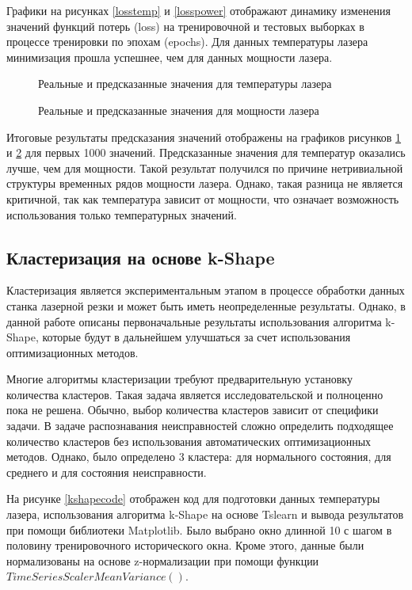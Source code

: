 Графики на рисунках \ref{losstemp} и \ref{losspower}
отображают динамику изменения значений функций потерь (loss)
на тренировочной и тестовых выборках
в процессе тренировки по эпохам (epochs).
Для данных температуры лазера
минимизация прошла успешнее,
чем для данных мощности лазера.


\begin{figure}[H]
    \caption{Реальные и предсказанные значения для температуры лазера}
    \label{predtemp}
\end{figure}


\begin{figure}[H]
    \caption{Реальные и предсказанные значения для мощности лазера}
    \label{predpower}
\end{figure}

Итоговые результаты предсказания значений отображены
на графиков рисунков \ref{predtemp} и \ref{predpower}
для первых 1000 значений.
Предсказанные значения для температур
оказались лучше, чем для мощности.
Такой результат получился по причине
нетривиальной структуры временных рядов мощности лазера.
Однако, такая разница не является критичной,
так как температура зависит от мощности,
что означает возможность использования только температурных значений.

\subsection{Кластеризация на основе k-Shape}


Кластеризация является экспериментальным этапом в процессе обработки данных станка лазерной резки
и может быть иметь неопределенные результаты.
Однако, в данной работе описаны первоначальные результаты использования алгоритма k-Shape,
которые будут в дальнейшем улучшаться за счет использования оптимизационных методов.

Многие алгоритмы кластеризации
требуют предварительную установку количества кластеров.
Такая задача является исследовательской
и полноценно пока не решена.
Обычно, выбор количества кластеров
зависит от специфики задачи.
В задаче распознавания неисправностей сложно
определить подходящее количество кластеров
без использования автоматических оптимизационных методов.
Однако, было определено 3 кластера: для нормального состояния,
для среднего и для состояния неисправности.


На рисунке \ref{kshapecode} отображен код для подготовки данных температуры лазера,
использования алгоритма k-Shape на основе Tslearn и вывода результатов
при помощи библиотеки Matplotlib.
Было выбрано окно длинной 10 с шагом в половину тренировочного исторического окна.
Кроме этого, данные были нормализованы на основе z-нормализации при помощи
функции $TimeSeriesScalerMeanVariance()$.

